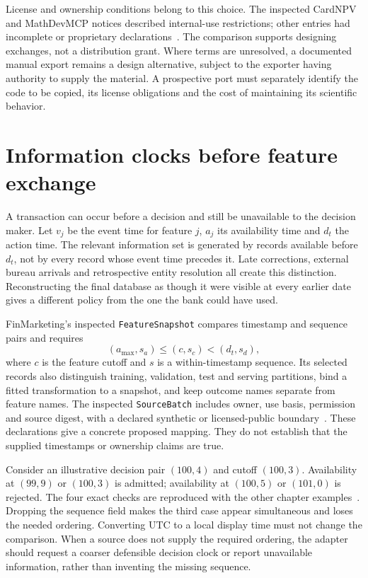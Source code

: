License and ownership conditions belong to this choice. The inspected
CardNPV and MathDevMCP notices described internal-use restrictions; other
entries had incomplete or proprietary declarations~\citep{v12_in_inventory}.
The comparison supports designing exchanges, not a distribution grant.
Where terms are unresolved, a documented manual export remains a design
alternative, subject to the exporter having authority to supply the material.
A prospective port must separately identify the code to be copied, its
license obligations and the cost of maintaining its scientific behavior.

\section{Information clocks before feature exchange}

A transaction can occur before a decision and still be unavailable to the
decision maker. Let $v_j$ be the event time for feature $j$, $a_j$ its
availability time and $d_t$ the action time. The relevant information set is
generated by records available before $d_t$, not by every record whose event
time precedes it. Late corrections, external bureau arrivals and retrospective
entity resolution all create this distinction. Reconstructing the final
database as though it were visible at every earlier date gives a different
policy from the one the bank could have used.

FinMarketing's inspected \texttt{FeatureSnapshot} compares timestamp and
sequence pairs and requires
\[
 (a_{\max},s_a)\leq(c,s_c)<(d_t,s_d),
\]
where $c$ is the feature cutoff and $s$ is a within-timestamp sequence.
Its selected records also distinguish training, validation, test and serving
partitions, bind a fitted transformation to a snapshot, and keep outcome
names separate from feature names. The inspected \texttt{SourceBatch}
includes owner, use basis, permission and source digest, with a declared
synthetic or licensed-public boundary~\citep{exec13_i3_inspection}. These
declarations give a concrete proposed mapping. They do not establish that
the supplied timestamps or ownership claims are true.

Consider an illustrative decision pair $(100,4)$ and cutoff $(100,3)$.
Availability at $(99,9)$ or $(100,3)$ is admitted; availability at $(100,5)$
or $(101,0)$ is rejected. The four exact checks are reproduced with the other
chapter examples~\citep{exec13_i3_examples}. Dropping the sequence field makes
the third case appear simultaneous and loses the needed ordering. Converting
UTC to a local display time must not change the comparison. When a source
does not supply the required ordering, the adapter should request a coarser
defensible decision clock or report unavailable information, rather than
inventing the missing sequence.

